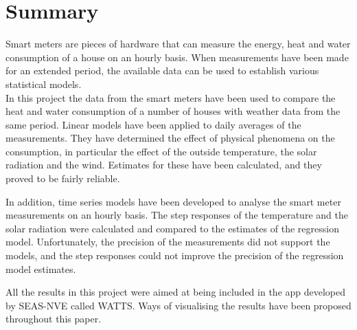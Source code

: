 \chapter{Summary}
Smart meters are pieces of hardware that can measure the energy, heat and water consumption of a house on an hourly basis. When measurements have been made for an extended period, the available data can be used to establish various statistical models.\\

\noindent In this project the data from the smart meters have been used to compare the heat and water consumption of a number of houses with weather data from the same period. Linear models have been applied to daily averages of the measurements. They have determined the effect of physical phenomena on the consumption, in particular the effect of the outside temperature, the solar radiation and the wind. Estimates for these have been calculated, and they proved to be fairly reliable.

\noindent In addition, time series models have been developed to analyse the smart meter measurements on an hourly basis. The step responses of the temperature and the solar radiation were calculated and compared to the estimates of the regression model. Unfortunately, the precision of the measurements did not support the models, and the step responses could not improve the precision of the regression model estimates.

\noindent All the results in this project were aimed at being included in the app developed by SEAS-NVE called WATTS. Ways of visualising the results have been proposed throughout this paper.